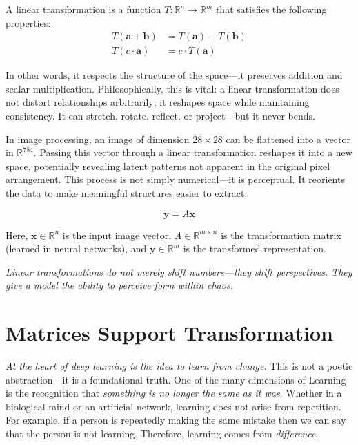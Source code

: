 \begin{definition}
	A linear transformation is a function \( T: \mathbb{R}^n \rightarrow \mathbb{R}^m \) that satisfies the following properties:
	\begin{align*}
		T(\mathbf{a} + \mathbf{b}) &= T(\mathbf{a}) + T(\mathbf{b}) \\
		T(c \cdot \mathbf{a}) &= c \cdot T(\mathbf{a})
	\end{align*}
\end{definition}

In other words, it respects the structure of the space—it preserves addition and scalar multiplication. Philosophically, this is vital: a linear transformation does not distort relationships arbitrarily; it reshapes space while maintaining consistency. It can stretch, rotate, reflect, or project—but it never bends.

In image processing, an image of dimension \( 28 \times 28 \) can be flattened into a vector in \( \mathbb{R}^{784} \). Passing this vector through a linear transformation reshapes it into a new space, potentially revealing latent patterns not apparent in the original pixel arrangement. This process is not simply numerical—it is perceptual. It reorients the data to make meaningful structures easier to extract.

\[
\mathbf{y} = A\mathbf{x}
\]

Here, \( \mathbf{x} \in \mathbb{R}^{n} \) is the input image vector, \( A \in \mathbb{R}^{m \times n} \) is the transformation matrix (learned in neural networks), and \( \mathbf{y} \in \mathbb{R}^m \) is the transformed representation.

\textit{Linear transformations do not merely shift numbers—they shift perspectives. They give a model the ability to perceive form within chaos.}



\section{Matrices Support Transformation}

\textit{At the heart of deep learning is the idea to learn from change.}  
This is not a poetic abstraction—it is a foundational truth. One of the many dimensions of Learning is the recognition that \textit{something is no longer the same as it was}. Whether in a biological mind or an artificial network, learning does not arise from repetition. For example, if a person is repeatedly making the same mistake then we can say that the person is not learning. Therefore, learning comes from \textit{difference}.

